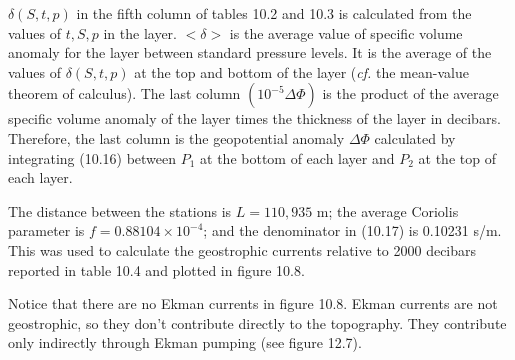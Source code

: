 $\delta (S, t, p)$ in the fifth column of tables 10.2 and 10.3 is
calculated from the values of $t, S, p$ in the layer.  $<\delta >$ is
the average value of specific volume anomaly for the layer between
standard pressure levels. It is the average of the values of $\delta
(S, t, p)$ at the top and bottom of the layer (\textit{cf.} the
mean-value theorem of calculus). The last column $(10^{-5}
\Delta\Phi)$ is the product of the average specific volume anomaly of
the layer times the thickness of the layer in decibars. Therefore, the
last column is the geopotential anomaly $\Delta \Phi$ calculated by
integrating (10.16) between $P_1$ at the bottom of each layer and
$P_2$ at the top of each layer.

The distance between the stations is $L = 110,935$ m; the average
Coriolis parameter is $f = 0.88104 \times 10^{-4}$;
and the denominator in (10.17) is 0.10231 s/m. This was used
to calculate the geostrophic currents relative to 2000 decibars
reported in table 10.4 and plotted in figure 10.8.

Notice that there are no Ekman currents in figure
10.8.  Ekman currents are not geostrophic, so they don't contribute
directly to the topography. They contribute only indirectly through
Ekman pumping (see figure 12.7).

